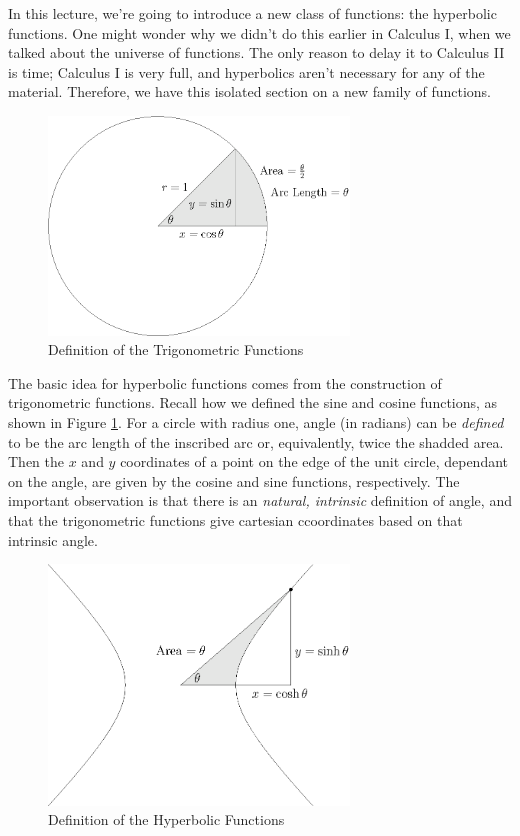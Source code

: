 \documentclass[fleqn]{report}
\begin{document}
In this lecture, we're going to introduce a new class of
functions: the hyperbolic functions. One might wonder why we
didn't do this earlier in Calculus I, when we talked about the
universe of functions. The only reason to delay it to Calculus
II is time; Calculus I is very full, and hyperbolics aren't
necessary for any of the material. Therefore, we have this
isolated section on a new family of functions.

\begin{figure}[ht]
\centering
\includegraphics[width=8cm]{figure01.eps}
\caption{Definition of the Trigonometric Functions}
\label{figure-trig-definition}
\end{figure}

The basic idea for hyperbolic functions comes from the
construction of trigonometric functions. Recall how we
defined the sine and cosine functions, as shown in 
Figure \ref{figure-trig-definition}. For a
circle with radius one, angle (in radians) can be \emph{defined}
to be the arc length of the inscribed arc or, equivalently,
twice the shadded area. Then the $x$ and $y$ coordinates of a
point on the edge of the unit circle, dependant on the angle,
are given by the cosine and sine functions, respectively. The
important observation is that there is an \emph{natural,
intrinsic} definition of angle, and that the trigonometric
functions give cartesian ccoordinates based on that intrinsic
angle.

\begin{figure}[hb]
\centering
\includegraphics[width=8cm]{figure02.eps}
\caption{Definition of the Hyperbolic Functions}
\label{figure-hyperbolic-definition}
\end{figure}
\end{document}
